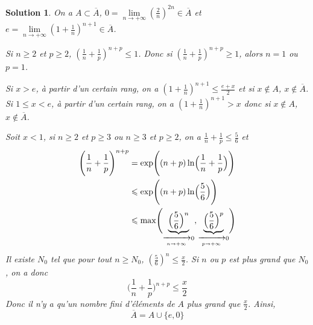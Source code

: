 \documentclass[12pt]{article}
\newtheorem{solution}{Solution}[section]
\theoremstyle{remark}
\numberwithin{equation}{section}
\begin{document}
\begin{solution}
	On a $A\subset\overline{A}$, $0=\lim\limits_{n\to+\infty}(\frac{2}{n})^{2n}\in\overline{A}$ et $e=\lim\limits_{n\to+\infty}(1+\frac{1}{n})^{n+1}\in\overline{A}$.

	Si $n\geqslant2$ et $p\geqslant2$, $(\frac{1}{n}+\frac{1}{p})^{n+p}\leqslant1$. Donc si $(\frac{1}{n}+\frac{1}{p})^{n+p}\geqslant1$, alors $n=1$ ou $p=1$.

	Si $x>e$, à partir d'un certain rang, on a $(1+\frac{1}{n})^{n+1}\leqslant\frac{e+x}{2}$ et si $x\notin A$, $x\notin\overline{A}$.
	Si $1\leqslant x<e$, à partir d'un certain rang, on a $(1+\frac{1}{n})^{n+1}>x$ donc si $x\notin A$, $x\notin\overline{A}$.

	Soit $x<1$, si $n\geqslant2$ et $p\geqslant3$ ou $n\geqslant3$ et $p\geqslant2$, on a $\frac{1}{n}+\frac{1}{p}\leqslant\frac{5}{6}$ et 
	\begin{align*}
		\Biggl(\frac{1}{n}+\frac{1}{p}\Biggr)^{n+p}
		&=\exp\Biggl((n+p)\ln\Bigl(\frac{1}{n}+\frac{1}{p}\Bigr)\Biggr)\\
		&\leqslant\exp\Biggl((n+p)\ln\Bigl(\frac{5}{6}\Bigr)\Biggr)\\
		&\leqslant\max\Biggl(\underbrace{\Bigl(\frac{5}{6}\Bigr)^{n}}_{\xrightarrow[n\to+\infty]{}0},\underbrace{\Bigl(\frac{5}{6}\Bigr)^{p}}_{\xrightarrow[p\to+\infty]{}0}\Biggr)
	\end{align*}
	Il existe $N_{0}$ tel que pour tout $n\geqslant N_{0}$, $(\frac{5}{6})^{n}\leqslant\frac{x}{2}$. Si $n$ ou $p$ est plus grand que $N_{0}$, on a donc 
	$$\Biggl(\frac{1}{n}+\frac{1}{p}\Biggr)^{n+p}\leqslant\frac{x}{2}$$
	Donc il n'y a qu'un nombre fini d'éléments de $A$ plus grand que $\frac{x}{2}$. Ainsi,
	$$\overline{A}=A\cup\{e,0\}$$
\end{solution}
\end{document}

